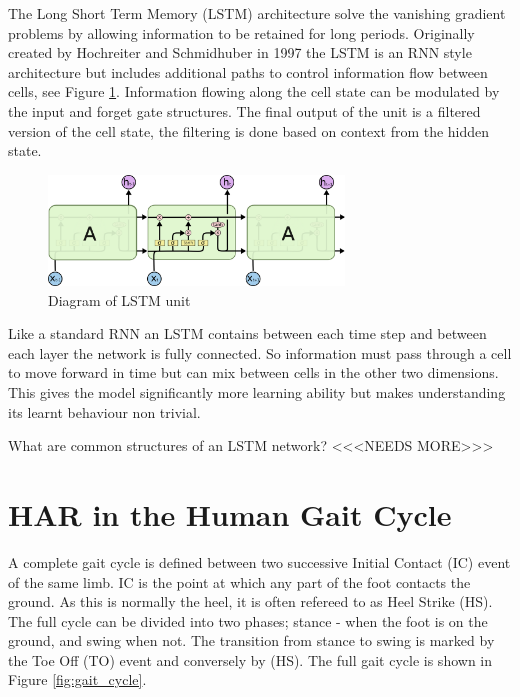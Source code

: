\documentclass[sensors,article,submit,moreauthors,pdftex]{Definitions/mdpi}
\begin{document}
The Long Short Term Memory (LSTM) architecture solve the vanishing gradient problems by allowing information to be retained for long periods. Originally created by Hochreiter and Schmidhuber in 1997\cite{Hochreiter1997} the LSTM is an RNN style architecture but includes additional paths to control information flow between cells, see Figure \ref{fig:lstm_unit}. Information flowing along the cell state can be modulated by the input and forget gate structures. The final output of the unit is a filtered version of the cell state, the filtering is done based on context from the hidden state.\cite{Olah2015}   %
\begin{figure}[!htb]
    \centering
    \includegraphics[width=0.7\textwidth]{Figures/lstm/LSTM-chain.png}
    \caption{Diagram of LSTM unit \cite{Olah2015}}
    \label{fig:lstm_unit}
\end{figure}

Like a standard RNN an LSTM contains between each time step and between each layer the network is fully connected. So information must pass through a cell to move forward in time but can mix between cells in the other two dimensions. This gives the model significantly more learning ability but makes understanding its learnt behaviour non trivial.

What are common structures of an LSTM network? <<<NEEDS MORE>>>

\section{HAR in the Human Gait Cycle}
A complete gait cycle is defined between two successive Initial Contact (IC) event of the same limb. IC is the point at which any part of the foot contacts the ground. As this is normally the heel, it is often refereed to as Heel Strike (HS). The full cycle can be divided into two phases; stance - when the foot is on the ground, and swing when not. The transition from stance to swing is marked by the Toe Off (TO) event and conversely by (HS). The full gait cycle is shown in Figure \ref{fig:gait_cycle}.
\end{document}
